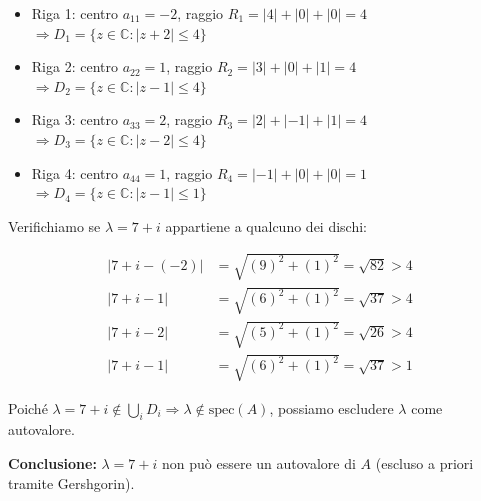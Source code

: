 \documentclass[12pt,a4paper]{article}
\begin{document}
\begin{itemize}
  \item Riga 1: centro $a_{11} = -2$, raggio $R_1 = |4| + |0| + |0| = 4$ \\
  $\Rightarrow D_1 = \{ z \in \mathbb{C} : |z + 2| \le 4 \}$
  
  \item Riga 2: centro $a_{22} = 1$, raggio $R_2 = |3| + |0| + |1| = 4$ \\
  $\Rightarrow D_2 = \{ z \in \mathbb{C} : |z - 1| \le 4 \}$
  
  \item Riga 3: centro $a_{33} = 2$, raggio $R_3 = |2| + |{-1}| + |1| = 4$ \\
  $\Rightarrow D_3 = \{ z \in \mathbb{C} : |z - 2| \le 4 \}$
  
  \item Riga 4: centro $a_{44} = 1$, raggio $R_4 = |{-1}| + |0| + |0| = 1$ \\
  $\Rightarrow D_4 = \{ z \in \mathbb{C} : |z - 1| \le 1 \}$
\end{itemize}

\vspace{1em}

\noindent
Verifichiamo se $\lambda = 7 + i$ appartiene a qualcuno dei dischi:

\[
\begin{aligned}
|7 + i - (-2)| &= \sqrt{(9)^2 + (1)^2} = \sqrt{82} > 4 \\
|7 + i - 1| &= \sqrt{(6)^2 + (1)^2} = \sqrt{37} > 4 \\
|7 + i - 2| &= \sqrt{(5)^2 + (1)^2} = \sqrt{26} > 4 \\
|7 + i - 1| &= \sqrt{(6)^2 + (1)^2} = \sqrt{37} > 1
\end{aligned}
\]

\vspace{1em}

\noindent
Poiché $\lambda = 7 + i \notin \bigcup_i D_i \Rightarrow \lambda \notin \text{spec}(A)$, possiamo escludere $\lambda$ come autovalore.

\vspace{1em}

\noindent
\textbf{Conclusione:} $\lambda = 7 + i$ non può essere un autovalore di $A$ (escluso a priori tramite Gershgorin).
\end{document}
